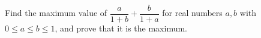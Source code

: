 Find the maximum value of $\dfrac{a}{1+b}+\dfrac{b}{1+a}$ for real numbers $a,b$ with $0\le a\le b\le1$, and prove that it is the maximum.
